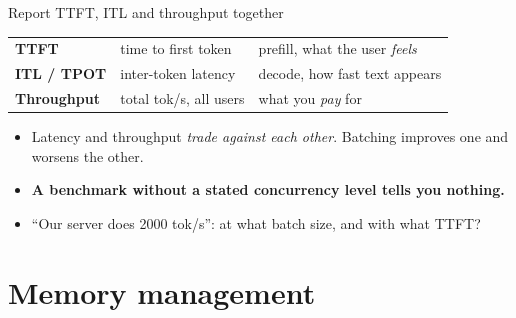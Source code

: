 \documentclass[aspectratio=169,10pt]{beamer}
\newcommand{\warnc}[1]{\textcolor{warn}{\textbf{#1}}}
\begin{document}
\begin{frame}{Report TTFT, ITL and throughput together}
  \begin{center}
    \begin{tabular}{lll}
      \toprule
      \textbf{TTFT} & time to first token & prefill, what the user \emph{feels} \\
      \textbf{ITL / TPOT} & inter-token latency & decode, how fast text appears \\
      \textbf{Throughput} & total tok/s, all users & what you \emph{pay} for \\
      \bottomrule
    \end{tabular}
  \end{center}
  \vspace{1.0em}
  \begin{itemize}
    \item Latency and throughput \emph{trade against each other}.
          Batching improves one and worsens the other.
    \item \warnc{A benchmark without a stated concurrency level tells you nothing.}
    \item ``Our server does 2000 tok/s'': at what batch size, and with
          what TTFT?
  \end{itemize}
\end{frame}



\section{Memory management}

\end{document}
